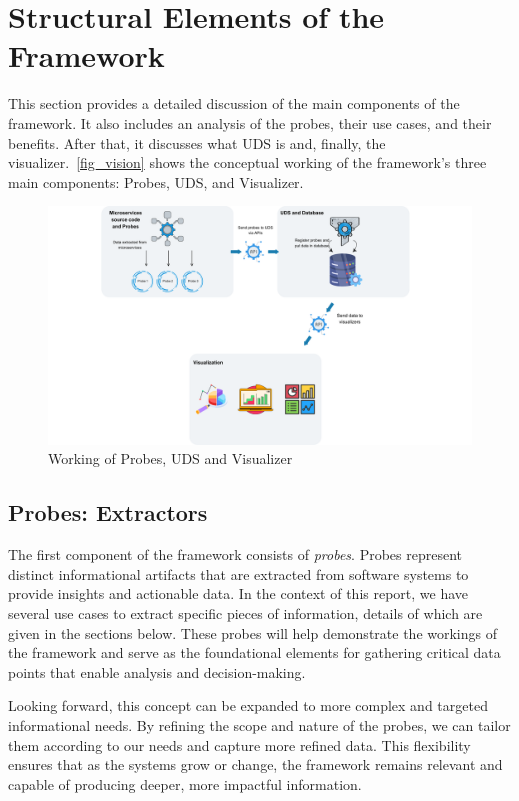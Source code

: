 \section{Structural Elements of the Framework}\label{sec:tech-strategy}

This section provides a detailed discussion of the main components of the framework. It also includes an analysis of the probes, their use cases, and their benefits. After that, it discusses what UDS is and, finally, the visualizer.~\autoref{fig_vision} shows the conceptual working of the framework's three main components: Probes, UDS, and Visualizer.

\begin{figure}[H]
    \centering
    \includegraphics[width=1\textwidth]{figures/vision.png}
    \caption{Working of Probes, UDS and Visualizer}
	\label{fig_vision}
\end{figure}

\subsection{Probes: Extractors}\label{sec:component-probes}

The first component of the framework consists of \textit{probes}. Probes represent distinct informational artifacts that are extracted from software systems to provide insights and actionable data. In the context of this report, we have several use cases to extract specific pieces of information, details of which are given in the sections below. These probes will help demonstrate the workings of the framework and serve as the foundational elements for gathering critical data points that enable analysis and decision-making. 

Looking forward, this concept can be expanded to more complex and targeted informational needs. By refining the scope and nature of the probes, we can tailor them according to our needs and capture more refined data. This flexibility ensures that as the systems grow or change, the framework remains relevant and capable of producing deeper, more impactful information.


